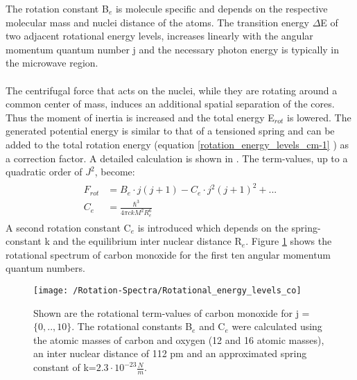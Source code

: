 The rotation constant B$_e$ is molecule specific and depends on the respective molecular mass and nuclei distance of the atoms.
The transition energy $\Delta$E of two adjacent rotational energy levels, increases linearly with the angular momentum quantum number j and the necessary photon energy is typically in the microwave region. \\\\ 
The centrifugal force that acts on the nuclei, while they are rotating around a common center of mass, induces an additional spatial separation of the cores. Thus the moment of inertia is increased and the total energy E$_{rot}$ is lowered. The generated potential energy is similar to that of a tensioned spring and can be added to the total rotation energy (equation \ref{rotation_energy_levels_cm-1} ) as a correction factor. A detailed calculation is shown in \cite{Demtroeder2015}. The term-values, up to a quadratic order of $J^2$, become:
 \begin{align}
\begin{split}
F_{rot}&= B_e \cdot j(j+1) -  C_e \cdot j^2(j+1)^2 + ...\\
C_e &=\frac{\hbar^3}{4 \pi c k M^2 R_e^6} 
\label{rotation_energy_levels_cm-1_final}
\end{split}
\end{align}
A second rotation constant C$_e$ is introduced which depends on the spring-constant k and the equilibrium inter nuclear distance R$_e$. Figure \ref{Figure:Rotation_spectrum-Co} shows the rotational spectrum of carbon monoxide for the first ten angular momentum quantum numbers.  
\begin{figure}[H]
	\centering
	\texttt{[image: /Rotation-Spectra/Rotational\_energy\_levels\_co]}
	\caption{Shown are the rotational term-values of carbon monoxide for j = $\{0,..,10\}$. The rotational constants B$_e$ and C$_e$ were calculated using the atomic masses of carbon and oxygen (12 and 16 atomic masses), an inter nuclear distance of 112 pm and an approximated spring constant of k=$2.3\cdot10^{-23}\frac{N}{m}$.}
	\label{Figure:Rotation_spectrum-Co}
\end{figure}
